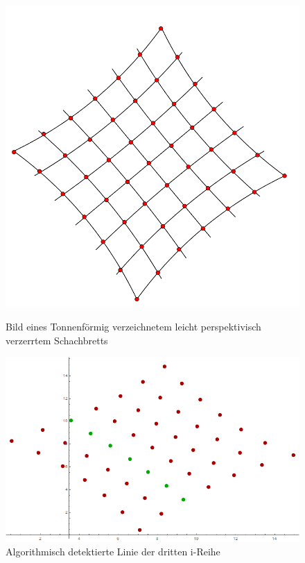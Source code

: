 \begin{figure}[!htb]
	\includegraphics[width=\linewidth]{images/extrBsp.png}
	\caption{Bild eines Tonnenförmig verzeichnetem leicht perspektivisch verzerrtem Schachbretts}
	\label{fig:Extreme9}
	\endminipage\hfill
	\includegraphics[width=\linewidth]{images/AlgExtrBsp.png}
	\caption{Algorithmisch detektierte Linie der dritten i-Reihe}
	\label{fig:Extreme10}
	\endminipage\hfill
\end{figure}


